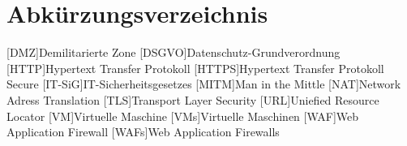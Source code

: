 \tableofcontents
\pagebreak

\section{Abkürzungsverzeichnis}

\begin{acronym}
    [DMZ]{Demilitarierte Zone}
    [DSGVO]{Datenschutz-Grundverordnung}
    [HTTP]{Hypertext Transfer Protokoll}
    [HTTPS]{Hypertext Transfer Protokoll Secure}
    [IT-SiG]{IT-Sicherheitsgesetzes}
    [MITM]{Man in the Mittle}
    [NAT]{Network Adress Translation}
    [TLS]{Transport Layer Security}
    [URL]{Uniefied Resource Locator}
    [VM]{Virtuelle Maschine}
    [VMs]{Virtuelle Maschinen}
    [WAF]{Web Application Firewall}
    [WAFs]{Web Application Firewalls}
\end{acronym}

\pagebreak

\listoffigures

\pagebreak